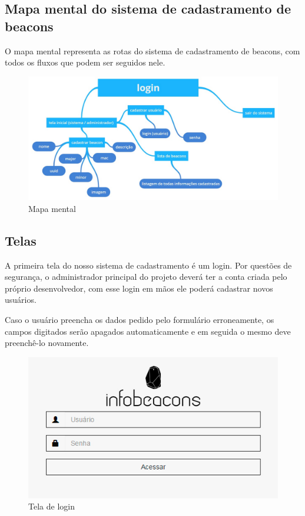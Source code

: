 \subsection{Mapa mental do sistema de cadastramento de beacons}
O mapa mental representa as rotas do sistema de cadastramento de beacons, com todos os fluxos que podem ser seguidos nele.

\begin{figure}[H]
  \centering
  \includegraphics[width=13cm]{./figs/MapaMental.jpg}
  \caption{Mapa mental}
  \par{}
\end{figure}

\subsection{Telas}

A primeira tela do nosso sistema de cadastramento é um login. Por questões de segurança, o administrador principal do projeto deverá ter a conta criada pelo próprio desenvolvedor, com esse login em mãos ele poderá cadastrar novos usuários. 

Caso o usuário preencha os dados pedido pelo formulário erroneamente, os campos digitados serão apagados automaticamente e em seguida o mesmo deve preenchê-lo novamente.

\begin{figure}[H]
  \centering
  \includegraphics[width=12cm]{./figs/Login.jpg}
  \caption{Tela de login}
  \par{}
\end{figure}

